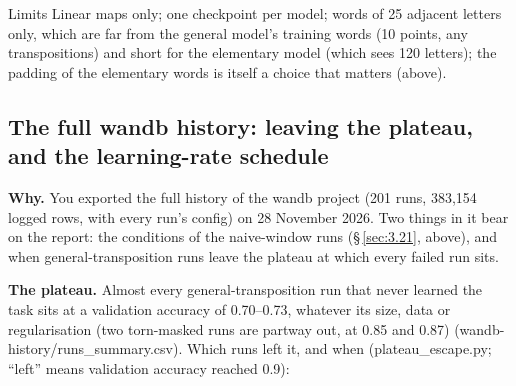 \documentclass[paper=a4,fontsize=11pt,DIV=11,parskip=half,headings=small,numbers=noendperiod]{scrartcl}
\DeclareRobustCommand{\lead}[1]{\textsf{\bfseries\color{accent}#1}}
\DeclareRobustCommand{\code}[1]{{\fontseries{m}\ttfamily #1}}
\begin{document}
\begin{limbox}{Limits}
Linear maps only; one checkpoint per model; words of 25 adjacent letters only, which are far from the general
model’s training words (10 points, any transpositions) and short for the elementary model (which sees 120
letters); the padding of the elementary words is itself a choice that matters (above).
\end{limbox}

\subsection{The full wandb history: leaving the plateau, and the learning-rate schedule}\label{sec:3.24}
\lead{Why.} You exported the full history of the wandb project (201 runs, 383,154 logged rows, with every run’s
config) on 28 November 2026. Two things in it bear on the report: the conditions of the naive-window runs
(\S\,\ref{sec:3.21}, above), and when general-transposition runs leave the plateau at which every failed run
sits.

\lead{The plateau.} Almost every general-transposition run that never learned the task sits at a validation
accuracy of 0.70–0.73, whatever its size, data or regularisation (two \code{torn-\allowbreak{}masked} runs are
partway out, at 0.85 and 0.87)
(\code{wandb-\allowbreak{}history/\allowbreak{}runs\_\allowbreak{}summary.\allowbreak{}csv}). Which runs left
it, and when (\code{plateau\_\allowbreak{}escape.\allowbreak{}py}; “left” means validation accuracy reached
0.9):
\end{document}
